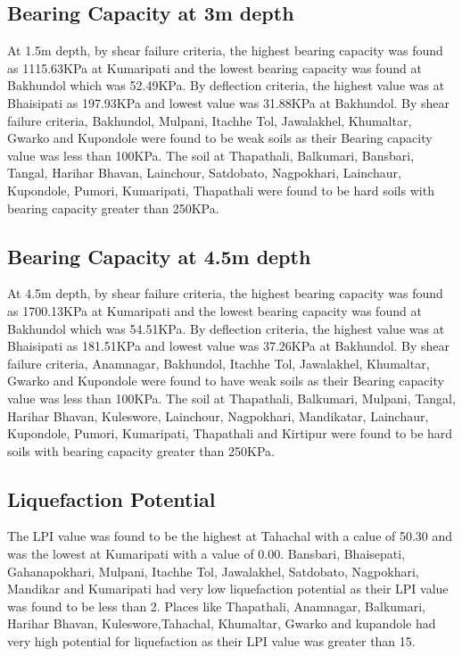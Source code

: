 \subsection{Bearing Capacity at 3m depth}
At 1.5m depth, by shear failure criteria, the highest bearing capacity was found as 1115.63KPa at Kumaripati and the lowest bearing capacity was found at Bakhundol which was 52.49KPa. By deflection criteria, the highest value was at Bhaisipati as 197.93KPa and lowest value was 31.88KPa at Bakhundol.
By shear failure criteria, Bakhundol, Mulpani, Itachhe Tol, Jawalakhel, Khumaltar, Gwarko and Kupondole were found to be weak soils as their Bearing capacity value was less than 100KPa. The soil at Thapathali, Balkumari, Bansbari, Tangal, Harihar Bhavan, Lainchour, Satdobato, Nagpokhari, Lainchaur, Kupondole, Pumori, Kumaripati, Thapathali were found to be hard soils with bearing capacity greater than 250KPa.

\subsection{Bearing Capacity at 4.5m depth}
At 4.5m depth, by shear failure criteria, the highest bearing capacity was found as 1700.13KPa at Kumaripati and the lowest bearing capacity was found at Bakhundol which was 54.51KPa. By deflection criteria, the highest value was at Bhaisipati as 181.51KPa and lowest value was 37.26KPa at Bakhundol.
By shear failure criteria, Anamnagar, Bakhundol, Itachhe Tol, Jawalakhel, Khumaltar, Gwarko and Kupondole were found to have weak soils as their Bearing capacity value was less than 100KPa. The soil at Thapathali, Balkumari, Mulpani, Tangal, Harihar Bhavan, Kuleswore, Lainchour, Nagpokhari, Mandikatar, Lainchaur, Kupondole, Pumori, Kumaripati, Thapathali and Kirtipur were found to be hard soils with bearing capacity greater than 250KPa.

\subsection{Liquefaction Potential}
The LPI value was found to be the highest at Tahachal with a calue of 50.30 and was the lowest at Kumaripati with a value of 0.00.
Bansbari, Bhaisepati, Gahanapokhari, Mulpani, Itachhe Tol, Jawalakhel, Satdobato, Nagpokhari, Mandikar and Kumaripati had very low liquefaction potential as their LPI value was found to be less than 2. Places like Thapathali, Anamnagar, Balkumari, Harihar Bhavan, Kuleswore,Tahachal, Khumaltar, Gwarko and kupandole had very high potential for liquefaction as their LPI value was greater than 15.